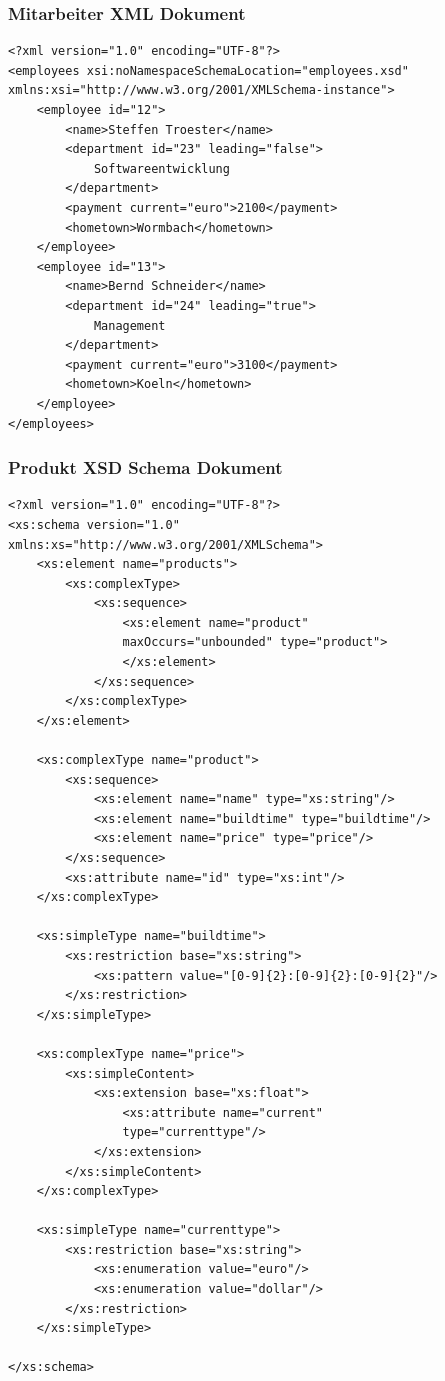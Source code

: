 \documentclass[DIV=calc,paper=a4,fontsize=9pt,twocolumn]{scrartcl}
\begin{document}
\subsubsection{Mitarbeiter XML Dokument}

\lstset{language=XML}
\begin{lstlisting}
<?xml version="1.0" encoding="UTF-8"?>
<employees xsi:noNamespaceSchemaLocation="employees.xsd"
xmlns:xsi="http://www.w3.org/2001/XMLSchema-instance">
    <employee id="12">
        <name>Steffen Troester</name>
        <department id="23" leading="false">
            Softwareentwicklung
        </department>
        <payment current="euro">2100</payment>
        <hometown>Wormbach</hometown>
    </employee>
    <employee id="13">
        <name>Bernd Schneider</name>
        <department id="24" leading="true">
            Management
        </department>
        <payment current="euro">3100</payment>
        <hometown>Koeln</hometown>
    </employee>
</employees>
\end{lstlisting}

\subsubsection{Produkt XSD Schema Dokument}

\lstset{language=XML}
\begin{lstlisting}
<?xml version="1.0" encoding="UTF-8"?>
<xs:schema version="1.0"
xmlns:xs="http://www.w3.org/2001/XMLSchema">
    <xs:element name="products">
        <xs:complexType>
            <xs:sequence>
                <xs:element name="product" 
                maxOccurs="unbounded" type="product">
                </xs:element>
            </xs:sequence>
        </xs:complexType>
    </xs:element>

    <xs:complexType name="product">
        <xs:sequence>
            <xs:element name="name" type="xs:string"/>
            <xs:element name="buildtime" type="buildtime"/>
            <xs:element name="price" type="price"/>
        </xs:sequence>
        <xs:attribute name="id" type="xs:int"/>
    </xs:complexType>

    <xs:simpleType name="buildtime">
        <xs:restriction base="xs:string">
            <xs:pattern value="[0-9]{2}:[0-9]{2}:[0-9]{2}"/>
        </xs:restriction>
    </xs:simpleType>

    <xs:complexType name="price">
        <xs:simpleContent>
            <xs:extension base="xs:float">
                <xs:attribute name="current" 
                type="currenttype"/>
            </xs:extension>
        </xs:simpleContent>
    </xs:complexType>

    <xs:simpleType name="currenttype">
        <xs:restriction base="xs:string">
            <xs:enumeration value="euro"/>
            <xs:enumeration value="dollar"/>
        </xs:restriction>
    </xs:simpleType>

</xs:schema>
\end{lstlisting}
\end{document}
